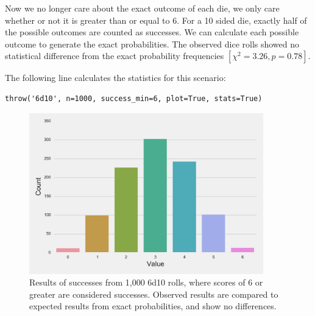 \documentclass{article}
\begin{document}
Now we no longer care about the exact outcome of each die, we only care whether or not it is greater than or equal to 6. For a 10 sided die, exactly half of the possible outcomes are counted as successes. We can calculate each possible outcome to generate the exact probabilities. The observed dice rolls showed no statistical difference from the exact probability frequencies $[\chi^2=3.26, p=0.78]$.

The following line calculates the statistics for this scenario:
\\
\begin{lstlisting}
throw('6d10', n=1000, success_min=6, plot=True, stats=True)
\end{lstlisting}

\begin{figure}[H]
\begin{floatrow}
\includegraphics[width=4in]{6d10_min6.pdf}
\end{floatrow}
\caption{Results of successes from 1,000 6d10 rolls, where scores of 6 or greater are considered successes. Observed results are compared to expected results from exact probabilities, and show no differences.}
\end{figure}
\end{document}
